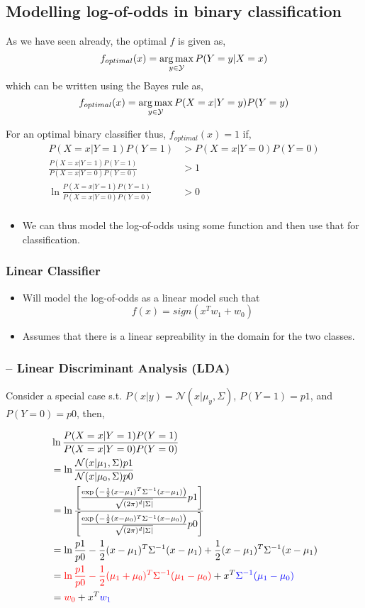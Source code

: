 \documentclass{article}
\begin{document}
\subsection{Modelling log-of-odds in binary classification}
As we have seen already, the optimal $f$ is given as,
$$f_{optimal}(x) = \operatorname*{arg\,max}_{y \in \mathcal{Y}} P(Y=y|X=x)$$
which can be written using the Bayes rule as,
$$f_{optimal}(x) = \operatorname*{arg\,max}_{y \in \mathcal{Y}} P(X=x|Y=y)P(Y=y)$$

For an optimal binary classifier thus, $f_{optimal}(x) = 1$ if,
\begin{align*}
    P(X=x|Y=1)P(Y=1) &> P(X=x|Y=0)P(Y=0) \\
    \frac{P(X=x|Y=1)P(Y=1)}{P(X=x|Y=0)P(Y=0)} &> 1 \\
    \ln{\frac{P(X=x|Y=1)P(Y=1)}{P(X=x|Y=0)P(Y=0)}} &> 0 \\
\end{align*}

\begin{itemize}
    \item We can thus model the log-of-odds using some function and then use that for classification.
\end{itemize}

\subsubsection{Linear Classifier}

\begin{itemize}
    \item Will model the log-of-odds as a linear model such that $$f(x) = sign(x^Tw_1+w_0)$$
    \item Assumes that there is a linear sepreability in the domain for the two classes.
\end{itemize}

\subsubsection{-- Linear Discriminant Analysis (LDA)}
Consider a special case s.t. $P(x|y) = \mathcal{N}(x|\mu_y, \Sigma)$, $P(Y=1) = p1$, and $P(Y=0)=p0$, then,

\begin{align*}
    &\ln{\frac{P(X=x|Y=1)P(Y=1)}{P(X=x|Y=0)P(Y=0)}}\\
    &= \ln{\frac{\mathcal{N}(x|\mu_1,\Sigma)p1}{\mathcal{N}(x|\mu_0,\Sigma)p0}} \\
    &= \ln{\frac{\left[\frac{\exp{\left(-\frac{1}{2}(x-\mu_1)^T\Sigma^{-1}(x-\mu_1)\right)}}{\sqrt{(2\pi)^d|\Sigma|}}p1\right]}{\left[\frac{\exp{\left(-\frac{1}{2}(x-\mu_0)^T\Sigma^{-1}(x-\mu_0)\right)}}{\sqrt{(2\pi)^d|\Sigma|}}p0\right]}} \\
    &= \ln{\frac{p1}{p0}}-\frac{1}{2}(x-\mu_1)^T\Sigma^{-1}(x-\mu_1) + \frac{1}{2}(x-\mu_1)^T\Sigma^{-1}(x-\mu_1)\\
    &= \textcolor{red}{\ln{\frac{p1}{p0}}-\frac{1}{2}(\mu_1+\mu_0)^T\Sigma^{-1}(\mu_1-\mu_0)} + x^T\textcolor{blue}{\Sigma^{-1}(\mu_1-\mu_0)}\\
    &= \textcolor{red}{w_0} + x^T\textcolor{blue}{w_1}\\
\end{align*}
\end{document}
